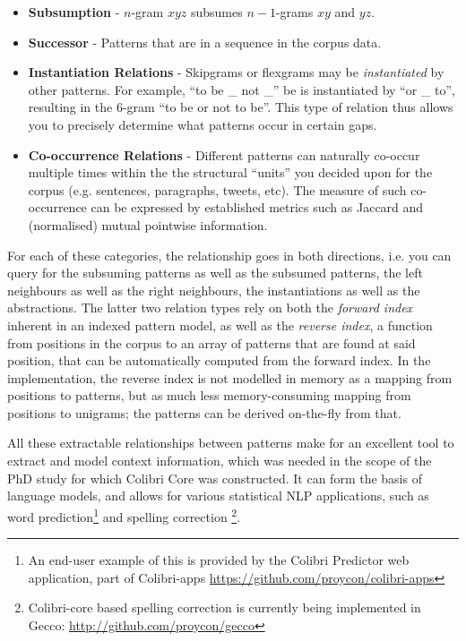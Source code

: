 \begin{itemize}
 \item \textbf{Subsumption} - $n$-gram $x y z$ subsumes $n-1$-grams $x y$ and $y z$. 
 \item \textbf{Successor} - Patterns that are in a sequence in the corpus data. 
 \item \textbf{Instantiation Relations} - Skipgrams or flexgrams may be
     \emph{instantiated} by other patterns. For example, ``to be \_ not \_'' be
     is instantiated by ``or \_ to'', resulting in the 6-gram ``to be or not to be''. This type of relation thus allows you to precisely determine what patterns occur in certain gaps.
 \item \textbf{Co-occurrence Relations} - Different patterns can naturally co-occur multiple times
     within the the structural ``units'' you decided upon for the corpus (e.g.
     sentences, paragraphs, tweets, etc). The measure of such co-occurrence 
     can be expressed by established metrics such as Jaccard and (normalised) mutual
     pointwise information.
\end{itemize}

For each of these categories, the relationship goes in both directions, i.e.
you can query for the subsuming patterns as well as the subsumed patterns, the
left neighbours as well as the right neighbours, the instantiations as well as
the abstractions. The latter two relation types rely on both the \emph{forward
index} inherent in an indexed pattern model, as well as the \emph{reverse
index}, a function from positions in the corpus to an array of patterns that
are found at said position, that can be automatically computed from the forward
index. In the implementation, the reverse index is not modelled in memory as a
mapping from positions to patterns, but as much less memory-consuming mapping
from positions to unigrams; the patterns can be derived on-the-fly from that.

All these extractable relationships between patterns make for an excellent tool
to extract and model context information, which was needed in the scope of the
PhD study for which Colibri Core was constructed. It can form the basis of
language models, and allows for various statistical NLP applications, such as
word prediction\footnote{An end-user example of this is provided by the Colibri
Predictor web application, part of Colibri-apps
\url{https://github.com/proycon/colibri-apps}} and spelling correction
\footnote{Colibri-core based spelling correction is currently being implemented
in Gecco: \url{http://github.com/proycon/gecco}}. 

